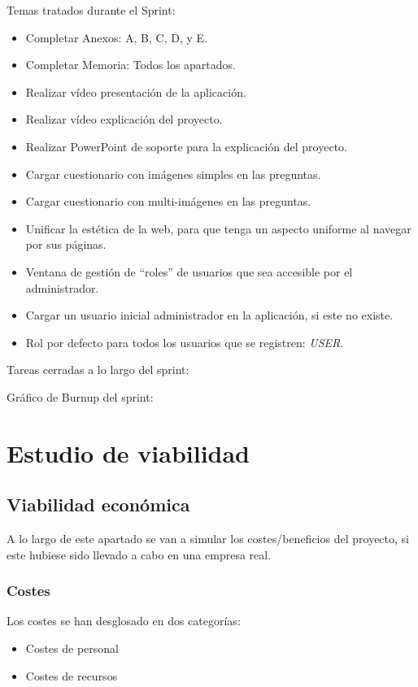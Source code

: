 Temas tratados durante el Sprint:
\begin{itemize}
	\item Completar Anexos: A, B, C, D, y E.
	\item Completar Memoria: Todos los apartados.
	\item Realizar vídeo presentación de la aplicación.
	\item Realizar vídeo explicación del proyecto.
	\item Realizar PowerPoint de soporte para la explicación del proyecto.
	\item Cargar cuestionario con imágenes simples en las preguntas.
	\item Cargar cuestionario con multi-imágenes en las preguntas.
	\item Unificar la estética de la web, para que tenga un aspecto uniforme al navegar por sus páginas.
	\item Ventana de gestión de ``roles'' de usuarios que sea accesible por el administrador.
	\item Cargar un usuario inicial administrador en la aplicación, si este no existe.
	\item Rol por defecto para todos los usuarios que se registren: \textit{USER}.
\end{itemize}
\clearpage
Tareas cerradas a lo largo del sprint:

Gráfico de Burnup del sprint:
\clearpage
\section{Estudio de viabilidad}

\subsection{Viabilidad económica}

A lo largo de este apartado se van a simular los costes/beneficios del proyecto, si este hubiese sido llevado a cabo en una empresa real.

\subsubsection{Costes}
Los costes se han desglosado en dos categorías:
\begin{itemize}
	\item	Costes de personal
	\item	Costes de recursos
\end{itemize}

